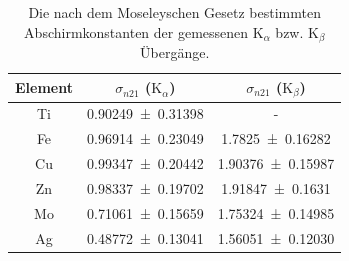 \documentclass[
	a4paper,
	12pt,
	pagesize,
	ngerman
]{scrartcl}
\begin{document}
	\begin{table}[H]
		\centering
		\begin{tabular}{ c | c | c}
			Element & $\sigma_{n21}$ ($\text{K}_\alpha$) &  $\sigma_{n21}$ ($\text{K}_\beta$)\\ \hline \hline
			Ti & \SI{0,90249+-0,31398}{} & - \\
			Fe & \SI{0,96914+-0,23049}{} & \SI{1,7825+-0,16282}{} \\
			Cu & \SI{0,99347+-0,20442}{} & \SI{1,90376+-0,15987}{} \\
			Zn & \SI{0.98337+-0.19702}{} & \SI{1.91847+-0.1631}{} \\
			Mo & \SI{0,71061+-0,15659}{} & \SI{1,75324+-0,14985}{} \\
			Ag & \SI{0,48772+-0,13041}{} & \SI{1,56051+-0,12030}{} \\		
		\end{tabular}
	\caption{Die nach dem Moseleyschen Gesetz bestimmten Abschirmkonstanten der gemessenen $\text{K}_\alpha$ bzw. $\text{K}_\beta$ Übergänge.}
	\label{tb_abschirm} 
	\end{table}	
\end{document}
